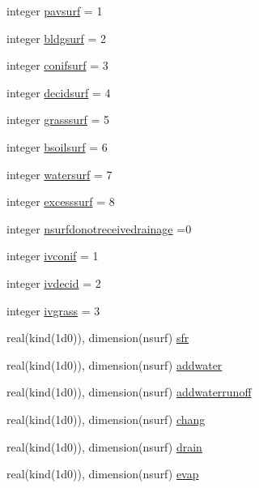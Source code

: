 \begin{DoxyCompactItemize}
\item 
integer \hyperlink{namespaceallocatearray_a5a6ce5dda0d024d7333d95ba544f38c9}{pavsurf} = 1
\item 
integer \hyperlink{namespaceallocatearray_afbbcbdfd67c32839a537f74d1bc6ff5a}{bldgsurf} = 2
\item 
integer \hyperlink{namespaceallocatearray_a459c0f2a9b9bf9bf8924b97f81b774b6}{conifsurf} = 3
\item 
integer \hyperlink{namespaceallocatearray_a7d7cb2bf89442acf85652779a9f82c2d}{decidsurf} = 4
\item 
integer \hyperlink{namespaceallocatearray_a414bbbb4213968c827d816bf384610ed}{grasssurf} = 5
\item 
integer \hyperlink{namespaceallocatearray_a570d73b34ec4b42f6f6075640a282619}{bsoilsurf} = 6
\item 
integer \hyperlink{namespaceallocatearray_ae2de5706788fcce82e02bb4d8f512988}{watersurf} = 7
\item 
integer \hyperlink{namespaceallocatearray_a4cc417e12e2821c143a2687fd02be496}{excesssurf} = 8
\item 
integer \hyperlink{namespaceallocatearray_af43f469ef09aa8c607146cf31d4c6eaf}{nsurfdonotreceivedrainage} =0
\item 
integer \hyperlink{namespaceallocatearray_a808db51d4a8ed78af7b4ea759da827a2}{ivconif} = 1
\item 
integer \hyperlink{namespaceallocatearray_a2cb5a7a20d0709bae84bb2339bb5d38f}{ivdecid} = 2
\item 
integer \hyperlink{namespaceallocatearray_a4f4900cf0725d3239c9973fc7c48e5ba}{ivgrass} = 3
\item 
real(kind(1d0)), dimension(nsurf) \hyperlink{namespaceallocatearray_a22ef94e8f1becc739e9945560050c844}{sfr}
\item 
real(kind(1d0)), dimension(nsurf) \hyperlink{namespaceallocatearray_a01b956e9e6112af17136ffd957d4c481}{addwater}
\item 
real(kind(1d0)), dimension(nsurf) \hyperlink{namespaceallocatearray_aa390fe06fd3fcecf38ff94ac0367e04c}{addwaterrunoff}
\item 
real(kind(1d0)), dimension(nsurf) \hyperlink{namespaceallocatearray_a2c176341a882c22aab3f1b01844f4fa0}{chang}
\item 
real(kind(1d0)), dimension(nsurf) \hyperlink{namespaceallocatearray_aeaa22bcbc221cc3e0ca82aa0ac739fd3}{drain}
\item 
real(kind(1d0)), dimension(nsurf) \hyperlink{namespaceallocatearray_a91095edf69a936902a3586fe9ef958a3}{evap}

\end{DoxyCompactItemize}
